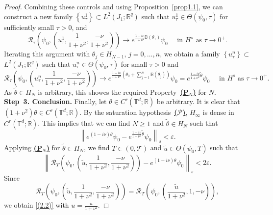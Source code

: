 \documentclass[10pt,a4paper]{amsart}
\def \geq{\geqslant}
\begin{document}
\begin{proof}
Combining these controls and using Proposition~\ref{prop1.1}, we can construct a new family $\left\{u_\tau^1\right\} \subset L^2\left(J_1 ; \mathbb{R}^q\right)$ such that $u_\tau^1 \in \Theta\left(\psi_0, \tau\right)$ for sufficiently small $\tau>0$, and
$$
\mathcal{R}_\tau\left(\psi_0, \left(u_\tau^1,\frac{1}{1+\nu^2},\frac{-\nu}{1+\nu^2}\right)\right) \rightarrow e^{\frac{1-i\nu}{1+\nu^2} \mathbb{B} (\theta_1 )} \psi_0 \quad \text { in } H^s \text { as } \tau \rightarrow 0^{+} .
$$
Iterating this argument with $\theta_j \in H_{N-1},\, j=0, \ldots, n$, we obtain a family $\left\{u_\tau^n\right\} \subset$ $L^2\left(J_1 ; \mathbb{R}^q\right)$ such that $u_\tau^n \in \Theta\left(\psi_0, \tau\right)$ for small $\tau>0$ and
$$
\mathcal{R}_\tau\left(\psi_0, \left(u_\tau^n,\frac{1}{1+\nu^2},\frac{-\nu}{1+\nu^2}\right)\right) \rightarrow e^{\frac{1-i\nu}{1+\nu^2}\left(\theta_0+\sum_{j=1}^n \mathbb{B} (\theta_j )\right)} \psi_0=e^{\frac{1-i\nu}{1+\nu^2} \tilde{\theta}} \psi_0 \quad \text { in } H^s \text { as } \tau \rightarrow 0^{+} .
$$
As $\tilde{\theta} \in H_N$ is arbitrary, this showes the required Property~\hyperlink{PN}{\textbf{(P$_{N}$)}} for $N$.
\\
\textbf{Step~3. Conclusion.}  Finally, let $\theta \in C^r\left(\mathbb{T}^d ; \mathbb{R}\right)$ be arbitrary. It is clear that $ (1+\nu^2)\theta\in C^r\left(\mathbb{T}^d ; \mathbb{R}\right) $. By the saturation hypothesis~{\hyperlink{H1}{\textbf{($\mathscr{P}$)}}}, $H_{\infty}$ is dense in $C^r\left(\mathbb{T}^d ; \mathbb{R}\right)$. This implies that we can find $N \geq 1$ and $\tilde{\theta} \in H_N$ such that
$$
\left\|e^{(1-i\nu)\theta} \psi_0-e^{\frac{1-i\nu}{1+\nu^2} \tilde{\theta}} \psi_0\right\|_s<\varepsilon.
$$
Applying \hyperlink{PN}{\textbf{(P$_{N}$)}}  for $\tilde{\theta} \in H_N$, we find $T \in(0, \mathcal{T})$ and $\tilde{u} \in \Theta\left(\psi_0, T\right)$ such that \begin{equation*}
	\left\|\mathcal{R}_T\left(\psi_0, \left(\tilde{u},\frac{1}{1+\nu^2},\frac{-\nu}{1+\nu^2}\right)\right)-e^{(1-i\nu) \theta} \psi_0\right\|_s<2\varepsilon.
\end{equation*}
Since
\begin{equation*}
\mathcal{R}_T\left(\psi_0, \left(\tilde{u},\frac{1}{1+\nu^2},\frac{-\nu}{1+\nu^2}\right)\right) = \mathcal{R}_T\left(\psi_0, \left(\frac{\tilde{u}}{1+\nu^2},1,-\nu\right)\right),
\end{equation*}
we obtain \eqref{(2.2)} with $ u= \frac{\tilde{u}}{1+\nu^2} $.


\end{proof}
\end{document}
